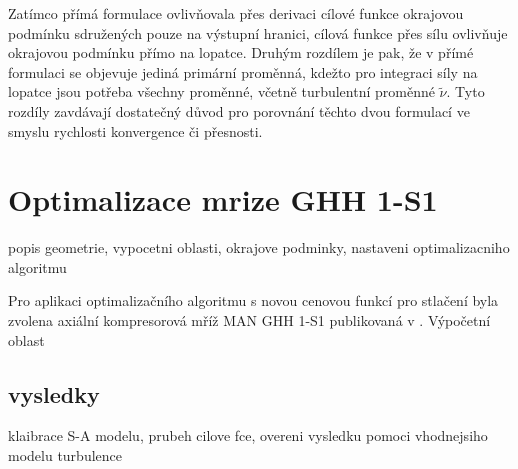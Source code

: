 Zatímco přímá formulace ovlivňovala přes derivaci cílové funkce okrajovou podmínku sdružených pouze na výstupní hranici, cílová funkce přes sílu ovlivňuje okrajovou podmínku přímo na lopatce. Druhým rozdílem je pak, že v přímé formulaci se objevuje jediná primární proměnná, kdežto pro integraci síly na lopatce jsou potřeba všechny proměnné, včetně turbulentní proměnné $ \widetilde{\nu} $. Tyto rozdíly zavdávají dostatečný důvod pro porovnání těchto dvou formulací ve smyslu rychlosti konvergence či přesnosti.


\section{Optimalizace mrize GHH 1-S1}

popis geometrie, vypocetni oblasti, okrajove podminky, nastaveni optimalizacniho algoritmu

Pro aplikaci optimalizačního algoritmu s novou cenovou funkcí pro stlačení byla zvolena axiální kompresorová mříž MAN GHH 1-S1 publikovaná v \cite{steinert1990design}. Výpočetní oblast 

\subsection{vysledky}
klaibrace S-A modelu, prubeh cilove fce, overeni vysledku pomoci vhodnejsiho modelu turbulence
